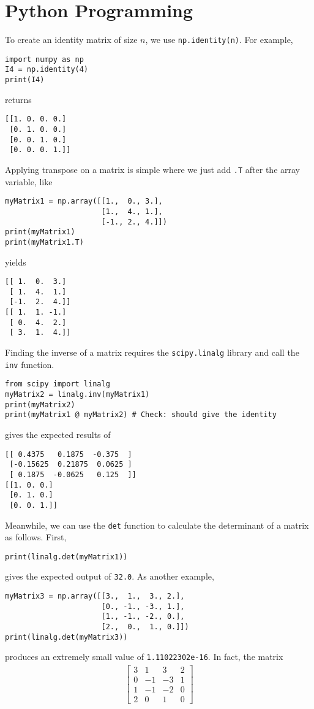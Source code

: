 \section{Python Programming}
\label{section:ch2python}
To create an identity matrix of size $n$, we use \verb|np.identity(n)|. For example,
\begin{lstlisting}
import numpy as np
I4 = np.identity(4)
print(I4)
\end{lstlisting}
returns
\begin{lstlisting}
[[1. 0. 0. 0.]
 [0. 1. 0. 0.]
 [0. 0. 1. 0.]
 [0. 0. 0. 1.]]
\end{lstlisting}
Applying transpose on a matrix is simple where we just add \verb|.T| after the array variable, like
\begin{lstlisting}
myMatrix1 = np.array([[1.,  0., 3.],
                      [1.,  4., 1.],
                      [-1., 2., 4.]])
print(myMatrix1)
print(myMatrix1.T)
\end{lstlisting}
yields
\begin{lstlisting}
[[ 1.  0.  3.]
 [ 1.  4.  1.]
 [-1.  2.  4.]]
[[ 1.  1. -1.]
 [ 0.  4.  2.]
 [ 3.  1.  4.]]
\end{lstlisting}
Finding the inverse of a matrix requires the \verb|scipy.linalg| library and call the \verb|inv| function.
\begin{lstlisting}
from scipy import linalg
myMatrix2 = linalg.inv(myMatrix1)
print(myMatrix2)
print(myMatrix1 @ myMatrix2) # Check: should give the identity
\end{lstlisting}
gives the expected results of
\begin{lstlisting}
[[ 0.4375   0.1875  -0.375  ]
 [-0.15625  0.21875  0.0625 ]
 [ 0.1875  -0.0625   0.125  ]]
[[1. 0. 0.]
 [0. 1. 0.]
 [0. 0. 1.]]
\end{lstlisting}
Meanwhile, we can use the \verb|det| function to calculate the determinant of a matrix as follows. First,
\begin{lstlisting}
print(linalg.det(myMatrix1))
\end{lstlisting}
gives the expected output of \verb|32.0|. As another example,
\begin{lstlisting}
myMatrix3 = np.array([[3.,  1.,  3., 2.],
                      [0., -1., -3., 1.],
                      [1., -1., -2., 0.],
                      [2.,  0.,  1., 0.]])
print(linalg.det(myMatrix3))  
\end{lstlisting}
produces an extremely small value of \verb|1.11022302e-16|. In fact, the matrix
\begin{align*}
\begin{bmatrix}
3 & 1 & 3 & 2 \\
0 & -1 & -3 & 1 \\
1 & -1 & -2 & 0 \\
2 & 0 & 1 & 0    
\end{bmatrix}
\end{align*}
